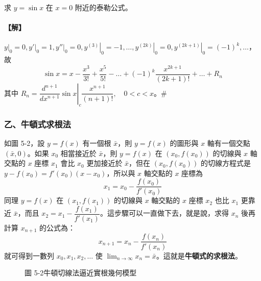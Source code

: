 \setcounter{example}{23}
\begin{example}\label{ex:b6s-app4-24}
求 $y=\sin x$ 在 $x=0$ 附近的泰勒公式。
\end{example}

\paragraph{【解】}
$\left.y\right|_0 = 0, \left.y'\right|_0 = 1, \left.y''\right|_0 = 0, \left.y^{(3)}\right|_0 = -1, \dots, \left.y^{(2k)}\right|_0 = 0, \left.y^{(2k+1)}\right|_0 = (-1)^k, \dots$，故
\[ \sin x = x - \dfrac{x^3}{3!} + \dfrac{x^5}{5!} - \dots + (-1)^k\dfrac{x^{2k+1}}{(2k+1)!} + \dots + R_n \]
其中 $R_n = \left.\dfrac{d^{n+1}}{dx^{n+1}}\sin x\right|_c \dfrac{x^{n+1}}{(n+1)!}, \quad 0<c<x$。\hfill$\#$

\subsubsection*{乙、牛頓式求根法}

如圖 5-2，設 $y=f(x)$ 有一個根 $\bar{x}$，則 $y=f(x)$ 的圖形與 $x$ 軸有一個交點 $(\bar{x}, 0)$。如果 $x_0$ 相當接近於 $\bar{x}$，則 $y=f(x)$ 在 $(x_0, f(x_0))$ 的切線與 $x$ 軸交點的 $x$ 座標 $x_1$ 會比 $x_0$ 更加接近於 $\bar{x}$，但在 $(x_0, f(x_0))$ 的切線方程式是 $y-f(x_0) = f'(x_0)(x-x_0)$，所以與 $x$ 軸交點的 $x$ 座標為
\[ x_1 = x_0 - \dfrac{f(x_0)}{f'(x_0)} \]
同理 $y=f(x)$ 在 $(x_1, f(x_1))$ 的切線與 $x$ 軸交點的 $x$ 座標 $x_2$ 也比 $x_1$ 更靠近 $\bar{x}$，而且 $x_2 = x_1 - \dfrac{f(x_1)}{f'(x_1)}$。這步驟可以一直做下去，就是說，求得 $x_n$ 後再計算 $x_{n+1}$ 的公式為：
\begin{equation}
x_{n+1} = x_n - \dfrac{f(x_n)}{f'(x_n)} \label{eq:b6s-app4-newton}
\end{equation}
就可得到一數列 $x_0, x_1, x_2, \dots$ 使 $\lim_{n\to\infty} x_n = \bar{x}$。這就是\textbf{牛頓式的求根法}。

\begin{figure}[H]
\centering
{}
\caption{圖 5-2\quad 牛頓切線法逼近實根幾何模型}
\label{fig:b6s-app4-newton-geom}
\end{figure}

